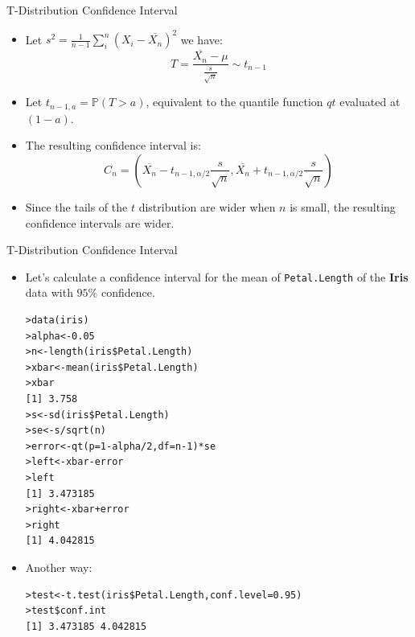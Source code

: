 \documentclass[handout]{beamer}
\begin{document}
\begin{frame}{T-Distribution Confidence Interval}

\scriptsize{
\begin{itemize}
 \item Let  $s^{2}= \frac{1}{n-1} \sum_{i}^{n}(X_{i}-\overline{X_{n}})^2$ we have:
 \begin{displaymath}
  T=\frac{\overline{X_{n}}-\mu}{\frac{s}{\sqrt{n}}}\sim t_{n-1}
 \end{displaymath}
\item  Let $t_{n-1,a}=\mathbb{P}(T>a)$, equivalent to the quantile function $qt$ evaluated at $(1-a)$.
\item The resulting confidence interval is:
       \begin{displaymath}
 C_n = (\overline{X_{n}}-t_{n-1,\alpha/2}\frac{s}{\sqrt{n}} , \overline{X_{n}} + t_{n-1,\alpha/2}\frac{s}{\sqrt{n}}) 
 \end{displaymath} 
 \item Since the tails of the $t$ distribution are wider when $n$ is small, the resulting confidence intervals are wider.

\end{itemize}


}

\end{frame}


\begin{frame}[fragile]{T-Distribution Confidence Interval}
\scriptsize{
\begin{itemize}
 \item Let's calculate a confidence interval for the mean of \verb+Petal.Length+ of the \textbf{Iris} data with $95\%$ confidence.
\begin{verbatim}
>data(iris)
>alpha<-0.05
>n<-length(iris$Petal.Length)
>xbar<-mean(iris$Petal.Length)
>xbar
[1] 3.758
>s<-sd(iris$Petal.Length)
>se<-s/sqrt(n)
>error<-qt(p=1-alpha/2,df=n-1)*se
>left<-xbar-error
>left
[1] 3.473185
>right<-xbar+error
>right
[1] 4.042815
\end{verbatim}
\item Another way:
\begin{verbatim}
>test<-t.test(iris$Petal.Length,conf.level=0.95)
>test$conf.int
[1] 3.473185 4.042815
\end{verbatim}


\end{itemize}


}
\end{frame}
\end{document}

